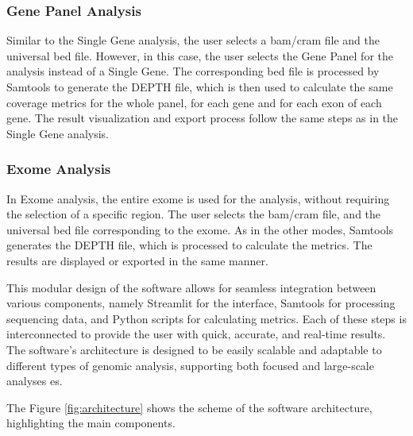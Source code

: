 \subsubsection{\textbf{Gene Panel Analysis}}

Similar to the Single Gene analysis, the user selects a \ac{bam}/\ac{cram} file and the universal \ac{bed} file. However, in this case, the user selects the Gene Panel for the analysis instead of a Single Gene. The corresponding \ac{bed} file is processed by Samtools to generate the DEPTH file, which is then used to calculate the same coverage metrics for the whole panel, for each gene and for each exon of each gene. The result visualization and export process follow the same steps as in the Single Gene analysis.

\subsubsection{\textbf{Exome Analysis}}

In Exome analysis, the entire exome is used for the analysis, without requiring the selection of a specific region. The user selects the \ac{bam}/\ac{cram} file, and the universal \ac{bed} file corresponding to the exome. As in the other modes, Samtools generates the DEPTH file, which is processed to calculate the metrics. The results are displayed or exported in the same manner.

This modular design of the software allows for seamless integration between various components, namely Streamlit for the interface, Samtools for processing sequencing data, and Python scripts for calculating metrics. Each of these steps is interconnected to provide the user with quick, accurate, and real-time results. The software's architecture is designed to be easily scalable and adaptable to different types of genomic analysis, supporting both focused and large-scale analyses \ac{es}.

The Figure \ref{fig:architecture} shows the scheme of the software architecture, highlighting the main components. 


